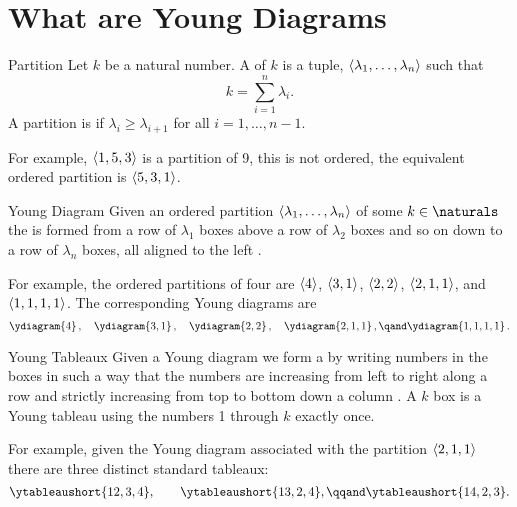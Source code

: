 \documentclass[fleqn]{NotesClass}
\DeclarePairedDelimiter{\tuple}{\langle}{\rangle}
\begin{document}
    \section{What are Young Diagrams}
    \begin{dfn}{Partition}{}
        Let \(k\) be a natural number.
        A  of \(k\) is a tuple, \(\tuple{\lambda_1, \dotsc, \lambda_n}\) such that \cite[720]{hassani}
        \begin{equation}
            k = \sum_{i = 1}^{n} \lambda_i.
        \end{equation}
        A partition is  if \(\lambda_i \ge \lambda_{i+1}\) for all \(i = 1, \dotsc, n - 1\).
    \end{dfn}

    For example, \(\tuple{1,5,3}\) is a partition of 9, this is not ordered, the equivalent ordered partition is \(\tuple{5,3,1}\).
    
    \begin{dfn}{Young Diagram}{}
        Given an ordered partition \(\tuple{\lambda_1, \dotsc, \lambda_n}\) of some \(k \in \naturals\) the  is formed from a row of \(\lambda_1\) boxes above a row of \(\lambda_2\) boxes and so on down to a row of \(\lambda_n\) boxes, all aligned to the left \cite[87]{cvitanovic}.
    \end{dfn}
    
    For example, the ordered partitions of four are \(\tuple{4}\), \(\tuple{3,1}\), \(\tuple{2,2}\), \(\tuple{2,1,1}\), and \(\tuple{1,1,1,1}\).
    The corresponding Young diagrams are
    \begin{equation}
        \ydiagram{4}\,, \quad \ydiagram{3,1}\,, \quad \ydiagram{2,2}\,, \quad \ydiagram{2,1,1}\,, \qand \ydiagram{1,1,1,1}\,.
    \end{equation}
    
    \begin{dfn}{Young Tableaux}{}
        Given a Young diagram we form a  by writing numbers in the boxes in such a way that the numbers are increasing from left to right along a row and strictly increasing from top to bottom down a column \cite{cvitanovic}.
        A \(k\) box  is a Young tableau using the numbers 1 through \(k\) exactly once.
    \end{dfn}
    
    For example, given the Young diagram associated with the partition \(\tuple{2,1,1}\) there are three distinct standard tableaux:
    \begin{equation}
        \ytableaushort{12,3,4}, \qquad \ytableaushort{13,2,4}, \qqand \ytableaushort{14,2,3}.
    \end{equation}
        
\end{document}
